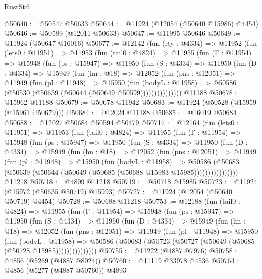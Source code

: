 \begin{lexlean}{RustStd}
\begin{coremodule}
@50640 := @50547 @50633
@50644 := @11924 (@12054 (@50640 @15986) @4454)
@50646 := @50589 (@12011 @50633)
@50647 := @11995 @50646
@50649 := @11924 (@50647 @16016)
@50677 := @12142
    (fun (rty : @4334) =>
    @11952
      (fun (lets0 : @11951) =>
      @11953
        (fun (tail0 : @4824) =>
        @11955
          (fun (Γ : @11954) =>
          @15948
            (fun (ps : @15947) =>
            @11950
              (fun (S : @4334) =>
              @11950
                (fun (D : @4334) =>
                @15949
                  (fun (hn : @18) =>
                  @12052
                    (fun (pns : @12051) =>
                    @11949
                      (fun (pl : @11948) =>
                      @15950
                        (fun (bodyL : @11958) =>
                        @50586 (@50530 (@50639 (@50644 (@50649 @50599)))))))))))))))
    @11188
@50678 := @15962 @11188
@50679 := @50678 @11942
@50683 := @11924 (@50528 (@15959 (@15961 @50679)))
@50684 := @12024 @11188
@50685 := @16019 @50684
@50688 := @12027 @50684 @50594 @50479
@50717 := @12164
    (fun (lets0 : @11951) =>
    @11953
      (fun (tail0 : @4824) =>
      @11955
        (fun (Γ : @11954) =>
        @15948
          (fun (ps : @15947) =>
          @11950
            (fun (S : @4334) =>
            @11950
              (fun (D : @4334) =>
              @15949
                (fun (hn : @18) =>
                @12052
                  (fun (pns : @12051) =>
                  @11949
                    (fun (pl : @11948) =>
                    @15950
                      (fun (bodyL : @11958) =>
                      @50586
                        (@50683
                          (@50639 (@50644 (@50649 (@50685 (@50688 @15983 @15985))))))))))))))))
    @11218
@50718 := @4809 @11218
@50719 := @50718 @15985
@50723 := @11924 (@15972 (@50635 @50719) @15993)
@50727 := @11924 (@12054 (@50640 @50719) @4454)
@50728 := @50688 @11218
@50753 := @12188
    (fun (tail0 : @4824) =>
    @11955
      (fun (Γ : @11954) =>
      @15948
        (fun (ps : @15947) =>
        @11950
          (fun (S : @4334) =>
          @11950
            (fun (D : @4334) =>
            @15949
              (fun (hn : @18) =>
              @12052
                (fun (pns : @12051) =>
                @11949
                  (fun (pl : @11948) =>
                  @15950
                    (fun (bodyL : @11958) =>
                    @50586 (@50683 (@50723 (@50727 (@50649 (@50685 (@50728 @15985)))))))))))))))
@50755 := @11222 (@4887 @7976)
@50758 := @4856 (@5269 (@4887 @8024))
@50760 := @11119 @33978 @4536
@50764 := @4856 (@5277 (@4887 @50760)) @4893

\end{coremodule}
\end{lexlean}
